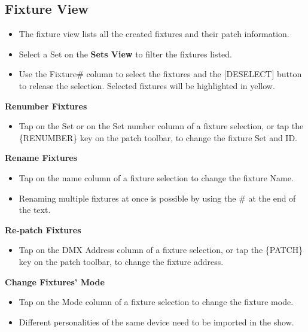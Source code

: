 \documentclass[
]{article}
\providecommand{\tightlist}{%
  \setlength{\itemsep}{0pt}\setlength{\parskip}{0pt}}
\begin{document}
\hypertarget{Fixture-View-5.5}{%
\subsection{Fixture View}\label{Fixture-View-5.5}}

\begin{itemize}
\tightlist
\item
  The fixture view lists all the created fixtures and their patch information.
\end{itemize}

\begin{itemize}
\item
  Select a Set on the \textbf{Sets View} to filter the fixtures listed.
\item
  Use the Fixture\# column to select the fixtures and the {[}DESELECT{]} button to release the selection. Selected fixtures will be highlighted in yellow.
\end{itemize}

\textbf{Renumber Fixtures}

\begin{itemize}
\tightlist
\item
  Tap on the Set or on the Set number column of a fixture selection, or tap the \{RENUMBER\} key on the patch toolbar, to change the fixture Set and ID.
\end{itemize}

\textbf{Rename Fixtures}

\begin{itemize}
\item
  Tap on the name column of a fixture selection to change the fixture Name.
\item
  Renaming multiple fixtures at once is possible by using the \# at the end of the text.
\end{itemize}

\textbf{Re-patch Fixtures}

\begin{itemize}
\tightlist
\item
  Tap on the DMX Address column of a fixture selection, or tap the \{PATCH\} key on the patch toolbar, to change the fixture address.
\end{itemize}

\textbf{Change Fixtures' Mode}

\begin{itemize}
\item
  Tap on the Mode column of a fixture selection to change the fixture mode.
\item
  Different personalities of the same device need to be imported in the show.
\end{itemize}
\end{document}

